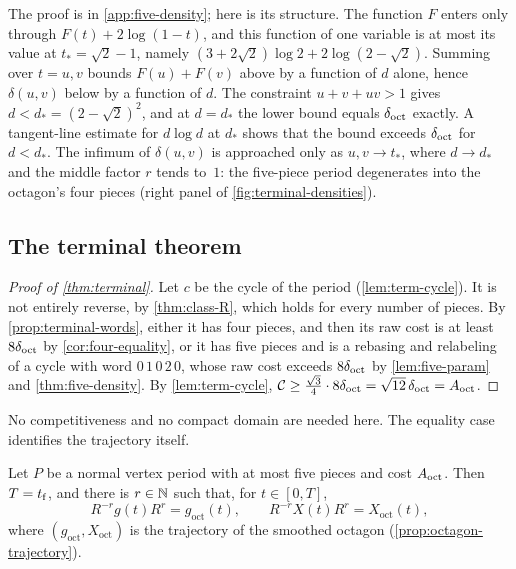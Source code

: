The proof is in \cref{app:five-density}; here is its structure. The function $F$ enters only
through $F(t)+2\log(1-t)$, and this function of one variable is at most its value at
$t_*=\sqrt2-1$, namely $(3+2\sqrt2)\log2+2\log(2-\sqrt2)$. Summing over
$t=u,v$ bounds $F(u)+F(v)$ above by a function of $d$ alone, hence $\delta(u,v)$ below by a
function of $d$. The constraint $u+v+uv>1$ gives $d<d_*=(2-\sqrt2)^2$, and at $d=d_*$ the lower
bound equals $\delta_{\mathrm{oct}}$ exactly. A tangent-line estimate for $d\log d$ at $d_*$ shows that the bound
exceeds $\delta_{\mathrm{oct}}$ for $d<d_*$. The infimum of $\delta(u,v)$ is approached only as $u,v\to t_*$,
where $d\to d_*$ and the middle factor $r$ tends to~$1$: the five-piece period degenerates into
the octagon's four pieces (right panel of \cref{fig:terminal-densities}).

\subsection{The terminal theorem}\label{sec:terminal-theorem}

\begin{proof}[Proof of \cref{thm:terminal}]
Let $c$ be the cycle of the period (\cref{lem:term-cycle}). It is not entirely reverse, by
\cref{thm:class-R}, which holds for every number of pieces. By \cref{prop:terminal-words}, either
it has four pieces, and then its raw cost is at least $8\delta_{\mathrm{oct}}$ by \cref{cor:four-equality}, or it
has five pieces and is a rebasing and relabeling of a cycle with word $0\,1\,0\,2\,0$, whose raw
cost exceeds $8\delta_{\mathrm{oct}}$ by \cref{lem:five-param} and \cref{thm:five-density}. By
\cref{lem:term-cycle},
$\mathcal{C}\ge\frac{\sqrt3}{4}\cdot8\delta_{\mathrm{oct}}=\sqrt{12}\,\delta_{\mathrm{oct}}=A_{\mathrm{oct}}$.
\end{proof}

No competitiveness and no compact domain are needed here. The equality case identifies the
trajectory itself.

\begin{proposition}\label{prop:terminal-equality}
Let $P$ be a normal vertex period with at most five pieces and cost $A_{\mathrm{oct}}$. Then $T=t_{\mathrm{f}}$, and
there is $r\in\mathbb{N}$ such that, for $t\in[0,T]$,
\[
 R^{-r}g(t)R^{r}=g_{\mathrm{oct}}(t),\qquad R^{-r}X(t)R^{r}=X_{\mathrm{oct}}(t),
\]
where $(g_{\mathrm{oct}},X_{\mathrm{oct}})$ is the trajectory of the smoothed octagon
(\cref{prop:octagon-trajectory}).
\end{proposition}

